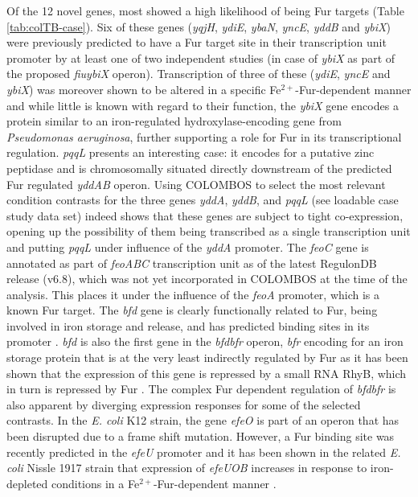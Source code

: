Of the 12 novel genes, most showed a high likelihood of being Fur targets 
(Table \ref{tab:colTB-case}). Six of these genes (\textit{yqjH}, \textit{ydiE}, 
\textit{ybaN}, \textit{yncE}, \textit{yddB} and \textit{ybiX}) were previously 
predicted to have a Fur target site in their transcription unit promoter by at 
least one of two independent studies \cite{Panina2001, Meysman2011} (in case of 
\textit{ybiX} as part of the proposed \textit{fiu}\textunderscore\textit{ybiX} 
operon). Transcription of three of these (\textit{ydiE}, \textit{yncE} and 
\textit{ybiX}) was moreover shown to be altered in a specific 
Fe$^{2+}$-Fur-dependent manner \cite{McHugh2003} and while little is known with 
regard to their function, the \textit{ybiX} gene encodes a protein similar to 
an iron-regulated hydroxylase-encoding gene from {\it Pseudomonas aeruginosa}, 
further supporting a role for Fur in its transcriptional regulation. 
\textit{pqqL} presents an interesting case: it encodes for a putative zinc 
peptidase and is chromosomally situated directly downstream of the predicted 
Fur regulated \textit{yddAB} operon. Using COLOMBOS to select the most relevant 
condition contrasts for the three genes \textit{yddA}, \textit{yddB}, and 
\textit{pqqL} (see loadable case study data set) indeed shows that these genes 
are subject to tight co-expression, opening up the possibility of them being 
transcribed as a single transcription unit and putting \textit{pqqL} under 
influence of the \textit{yddA} promoter. The \textit{feoC} gene is annotated as 
part of \textit{feoABC} transcription unit as of the latest RegulonDB release 
(v6.8), which was not yet incorporated in COLOMBOS at the time of the analysis. 
This places it under the influence of the \textit{feoA} promoter, which is a 
known Fur target. The \textit{bfd} gene is clearly functionally related to Fur, 
being involved in iron storage and release, and has predicted binding sites in 
its promoter \cite{Chen2007}. \textit{bfd} is also the first gene in the 
\textit{bfd}\textunderscore\textit{bfr} operon, \textit{bfr} encoding for an 
iron storage protein that is at the very least indirectly regulated by Fur as 
it has been shown that the expression of this gene is repressed by a small RNA 
RhyB, which in turn is repressed by Fur \cite{Masse2002}. The complex Fur 
dependent regulation of \textit{bfd}\textunderscore\textit{bfr} is also 
apparent by diverging expression responses for some of the selected contrasts. 
In the {\it E. coli} K12 strain, the gene \textit{efeO} is part of an operon 
that has been disrupted due to a frame shift mutation. However, a Fur binding 
site was recently predicted in the \textit{efeU} promoter \cite{Meysman2011} 
and it has been shown in the related {\it E. coli} Nissle 1917 strain that 
expression of \textit{efeUOB} increases in response to iron-depleted conditions 
in a Fe$^{2+}$-Fur-dependent manner \cite{Grosse2006}.

